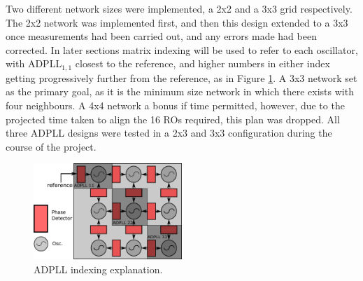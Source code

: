 Two different network sizes were implemented, a 2x2 and a 3x3 grid respectively. The 2x2 network was implemented first, and then this design extended to a 3x3 once measurements had been carried out, and any errors made had been corrected. In later sections matrix indexing will be used to refer to each oscillator, with \ac{ADPLL}$_{1,1}$ closest to the reference, and higher numbers in either index getting progressively further from the reference, as in Figure \ref{fig:network_mine}. A 3x3 network set as the primary goal, as it is the minimum size network in which there exists  with four neighbours. A 4x4 network a bonus if time permitted, however, due to the projected time taken to align the 16 \acp{RO} required, this plan was dropped. All three \ac{ADPLL} designs were tested in a 2x3 and 3x3 configuration during the course of the project.
\begin{figure}[h]
	\centering
	\includegraphics[width=0.5\textwidth]{../network_annotated}
	\caption[ADPLL indexing explanation]{ADPLL indexing explanation.}
	\label{fig:network_mine}
\end{figure}
